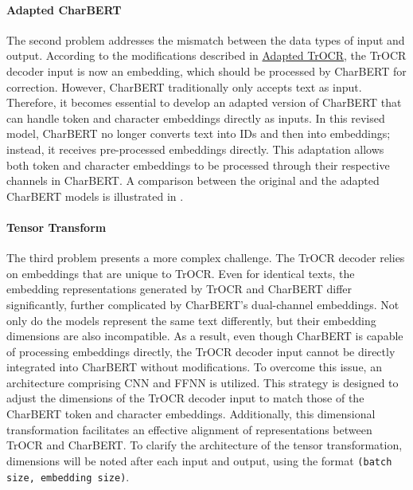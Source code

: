 \paragraph*{Adapted CharBERT}
\label{par:3_adapted_charbert}
The second problem addresses the mismatch between the data types of input and output. According to the modifications described in \hyperref[par:3_adapted_trocr]{Adapted TrOCR}, the TrOCR decoder input is now an embedding, which should be processed by CharBERT for correction. However, CharBERT traditionally only accepts text as input. Therefore, it becomes essential to develop an adapted version of CharBERT that can handle token and character embeddings directly as inputs. In this revised model, CharBERT no longer converts text into IDs and then into embeddings; instead, it receives pre-processed embeddings directly. This adaptation allows both token and character embeddings to be processed through their respective channels in CharBERT. A comparison between the original and the adapted CharBERT models is illustrated in .


\paragraph*{Tensor Transform}
\label{par:3_tensor_transform}
The third problem presents a more complex challenge. The TrOCR decoder relies on embeddings that are unique to TrOCR. Even for identical texts, the embedding representations generated by TrOCR and CharBERT differ significantly, further complicated by CharBERT's dual-channel embeddings. Not only do the models represent the same text differently, but their embedding dimensions are also incompatible. As a result, even though CharBERT is capable of processing embeddings directly, the TrOCR decoder input cannot be directly integrated into CharBERT without modifications. To overcome this issue, an architecture comprising CNN and FFNN is utilized. This strategy is designed to adjust the dimensions of the TrOCR decoder input to match those of the CharBERT token and character embeddings. Additionally, this dimensional transformation facilitates an effective alignment of representations between TrOCR and CharBERT. To clarify the architecture of the tensor transformation, dimensions will be noted after each input and output, using the format \texttt{(batch size, embedding size)}.

